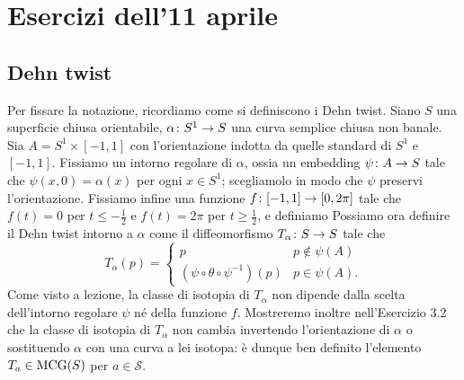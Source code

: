 \section*{Esercizi dell'11 aprile}

\subsection*{Dehn twist}
Per fissare la notazione, ricordiamo come si definiscono i Dehn twist. Siano $S$ una superficie chiusa orientabile, $\map{\alpha}{S^1}{S}$ una curva semplice chiusa non banale. Sia $A=S^1\times[-1,1]$ con l'orientazione indotta da quelle standard di $S^1$ e $[-1,1]$. Fissiamo un intorno regolare di $\alpha$, ossia un embedding $\map{\psi}{A}{S}$ tale che $\psi(x,0)=\alpha(x)$ per ogni $x\in S^1$; scegliamolo in modo che $\psi$ preservi l'orientazione. Fissiamo infine una funzione $\map{f}{[-1,1]}{[0,2\pi]}$ tale che
$f(t)=0$ per $t\le-\frac{1}{2}$ e $f(t)=2\pi$ per $t\ge\frac{1}{2}$, e definiamo
Possiamo ora definire il Dehn twist intorno a $\alpha$ come il diffeomorfismo $\map{T_\alpha}{S}{S}$ tale che
\[
T_\alpha(p)=\begin{cases}
p&p\not\in\psi(A)\\
(\psi\circ\theta\circ\psi^{-1})(p)&p\in\psi(A).
\end{cases}
\]
Come visto a lezione, la classe di isotopia di $T_\alpha$ non dipende dalla scelta dell'intorno regolare $\psi$ né della funzione $f$. Mostreremo inoltre nell'Esercizio 3.2 che la classe di isotopia di $T_\alpha$ non cambia invertendo l'orientazione di $\alpha$ o sostituendo $\alpha$ con una curva a lei isotopa: è dunque ben definito l'elemento $T_a\in\operatorname{MCG}(S)$ per $a\in\mathcal{S}$.

